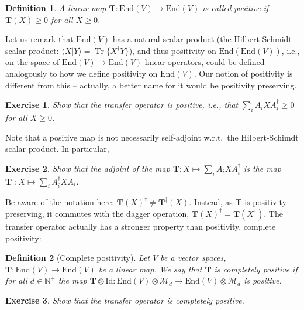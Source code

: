 \documentclass{article}
\newtheorem{definition}{Definition}
\newtheorem{exercise}{Exercise}
\newcommand{\tr}{\operatorname{Tr}}
\newcommand{\id}{\mathrm{Id}}
\newcommand{\End}{\mathrm{End}}
\newcommand{\scalprod}[2]{\langle #1 \vert #2 \rangle}
\begin{document}
\begin{definition}  
   A linear map $\mathbf{T}:\End(V)\to \End(V)$ is called positive if $\mathbf{T}(X)\geq 0$ for all $X\geq 0$.  
\end{definition}
Let us remark that $\End(V)$ has a natural scalar product (the Hilbert-Schmidt scalar product: $\scalprod{X}{Y} = \tr\{X^\dagger Y\}$), and thus positivity on $\End(\End(V))$, i.e., on the space of $\End(V)\to \End(V)$ linear operators, could be defined analogously to how we define positivity on $\End(V)$. Our notion of positivity is different from this -- actually, a better name for it would be positivity preserving. 
\begin{exercise}
  Show that the transfer operator is positive, i.e., that $\sum_i A_i X A_i^\dagger\geq 0$ for all $X\geq 0$. 
\end{exercise}
Note that a positive map is not necessarily self-adjoint w.r.t.\ the Hilbert-Schimdt scalar product. In particular,
\begin{exercise}
  Show that the adjoint of the map $\mathbf{T}:X\mapsto \sum_i A_i X A_i^\dagger$ is the map $\mathbf{T}^\dagger:X\mapsto \sum_i A_i^\dagger X A_i$.
\end{exercise}
Be aware of the notation here: $\mathbf{T}(X)^\dagger \neq \mathbf{T}^\dagger(X)$. Instead, as $\mathbf{T}$ is positivity preserving, it commutes with the dagger operation, $\mathbf{T}(X)^\dagger = \mathbf{T}(X^\dagger)$. The transfer operator actually has a stronger property than positivity, complete positivity:
\begin{definition}[Complete positivity]
  Let $V$ be a vector spaces, $\mathbf{T}:\End(V) \to \End(V)$ be a linear map. We say that $\mathbf{T}$ is completely positive if for all $d\in\mathbb{N}^+$ the map $\mathbf{T}\otimes \id: \End(V)\otimes \mathcal{M}_d \to \End(V)\otimes \mathcal{M}_d $ is positive. 
\end{definition}
\begin{exercise}
  Show that the transfer operator is completely positive. 
\end{exercise}
\end{document}
